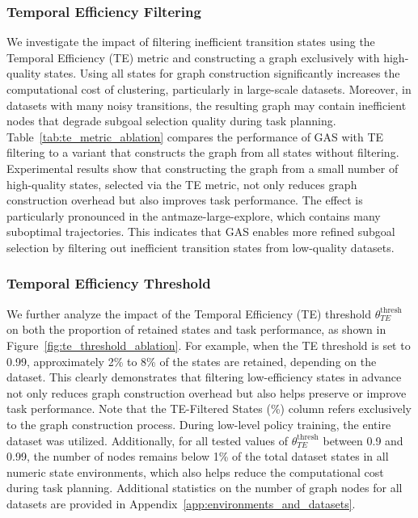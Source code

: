 \documentclass{article}
\begin{document}
\subsubsection{Temporal Efficiency Filtering} 
We investigate the impact of filtering inefficient transition states using the Temporal Efficiency (TE) metric and constructing a graph exclusively with high-quality states. Using all states for graph construction significantly increases the computational cost of clustering, particularly in large-scale datasets. Moreover, in datasets with many noisy transitions, the resulting graph may contain inefficient nodes that degrade subgoal selection quality during task planning. Table~\ref{tab:te_metric_ablation} compares the performance of GAS with TE filtering to a variant that constructs the graph from all states without filtering. Experimental results show that constructing the graph from a small number of high-quality states, selected via the TE metric, not only reduces graph construction overhead but also improves task performance. The effect is particularly pronounced in the antmaze-large-explore, which contains many suboptimal trajectories. This indicates that GAS enables more refined subgoal selection by filtering out inefficient transition states from low-quality datasets.

\subsubsection{Temporal Efficiency Threshold} 
We further analyze the impact of the Temporal Efficiency (TE) threshold $\theta_{TE}^{\text{thresh}}$ on both the proportion of retained states and task performance, as shown in Figure~\ref{fig:te_threshold_ablation}. 
For example, when the TE threshold is set to 0.99, approximately 2\% to 8\% of the states are retained, depending on the dataset. This clearly demonstrates that filtering low-efficiency states in advance not only reduces graph construction overhead but also helps preserve or improve task performance. Note that the TE-Filtered States (\%) column refers exclusively to the graph construction process. During low-level policy training, the entire dataset was utilized. Additionally, for all tested values of $\theta_{TE}^{\text{thresh}}$ between 0.9 and 0.99, the number of nodes remains below 1\% of the total dataset states in all numeric state environments, which also helps reduce the computational cost during task planning. Additional statistics on the number of graph nodes for all datasets are provided in Appendix~\ref{app:environments_and_datasets}.
\end{document}
